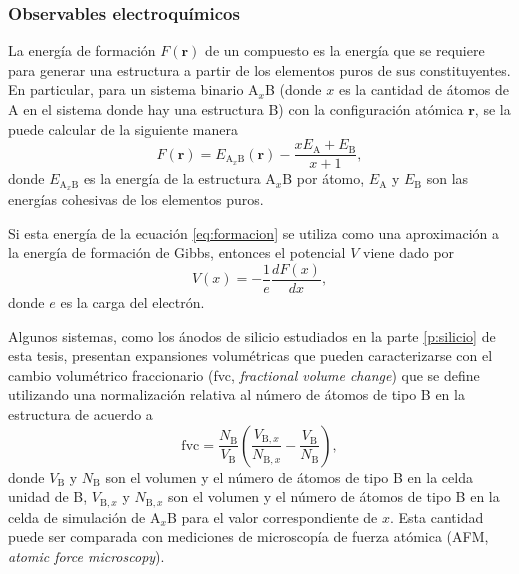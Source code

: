 \subsubsection{Observables electroquímicos}\label{ss:electrochim}

La energía de formación $F(\mathbf{r})$ de un compuesto es la energía que se requiere para generar 
una estructura a partir de los elementos puros de sus constituyentes. En particular, para un sistema binario A$_x$B (donde $x$ es la 
cantidad de átomos de A en el sistema donde hay una estructura B) con la configuración atómica
$\mathbf{r}$, se la puede calcular de la siguiente manera
\begin{equation}\label{eq:formacion}
    F(\mathbf{r}) = E_{\text{A}_x\text{B}}(\mathbf{r}) - \frac{x E_{\text{A}} + E_{\text{B}}}{x + 1},
\end{equation}
donde $E_{\text{A}_x\text{B}}$ es la energía de la estructura A$_x$B por átomo, 
$E_{\text{A}}$ y $E_{\text{B}}$ son las energías cohesivas de los elementos puros.

Si esta energía de la ecuación \ref{eq:formacion} se utiliza como una aproximación 
a la energía de formación de Gibbs, entonces el potencial $V$ viene dado por \cite{urban2016, aydinol1997}
\begin{equation}\label{eq:potencial}
    V(x) = - \frac{1}{e} \frac{d F(x)}{dx},
\end{equation}
donde $e$ es la carga del electrón.

Algunos sistemas, como los ánodos de silicio estudiados en la parte 
\ref{p:silicio} de esta tesis, presentan expansiones volumétricas que pueden 
caracterizarse con el cambio volumétrico fraccionario (fvc, \textit{fractional 
volume change}) que se define utilizando una normalización relativa al número de
átomos de tipo B en la estructura de acuerdo a 
\begin{equation}\label{eq:fvc}
    \text{fvc} = \frac{N_{\text{B}}}{V_{\text{B}}} \left( \frac{V_{\text{B},x}}{N_{\text{B},x}} - \frac{V_{\text{B}}}{N_{\text{B}}} \right),
\end{equation}
donde $V_{\text{B}}$ y $N_{\text{B}}$ son el volumen y el número de átomos de 
tipo B en la celda unidad de B, $V_{\text{B},x}$ y $N_{\text{B},x}$ son el 
volumen y el número de átomos de tipo B en la celda de simulación de A$_x$B para
el valor correspondiente de $x$. Esta cantidad puede ser comparada con mediciones
de microscopía de fuerza atómica (AFM, \textit{atomic force microscopy}).
